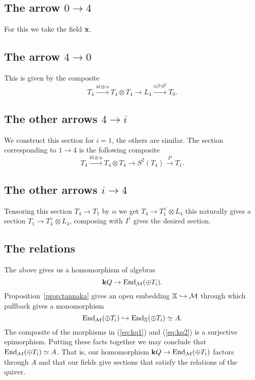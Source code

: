 \documentclass{amsart}
\theoremstyle{definition}
\begin{document}
\subsection{The arrow $0 \rightarrow 4$}

For this we take the field $\mathbf{x}$.

\subsection{The arrow $4 \rightarrow 0$}
This is given by the composite
$$T_4 \xrightarrow{\text{id}\otimes u} T_4 \otimes T_4 \rightarrow L_4 \xrightarrow{\alpha\beta\gamma\delta^2} T_0.$$

\subsection{The other arrows $4 \rightarrow i$}
We construct this section for $i=1$, the others are similar.
The section corresponding to $1 \rightarrow 4$ is the following composite $$T_4 \xrightarrow{\text{id}\otimes u} T_4 \otimes T_4 \rightarrow S^2(T_4) \xrightarrow{P} T_1.$$

\subsection{The other arrows $i \rightarrow 4$}
Tensoring this section $T_4 \rightarrow T_1$ by $\alpha$ we get $T_4 \rightarrow T_1^\vee \otimes L_4$ this naturally gives a section $T_1 \rightarrow T_4^\vee \otimes L_4$, composing with $I^\dagger$ gives the desired section.

\subsection{The relations}

The above gives us a homomorphism of algebras \begin{equation} \label{eq:kq1}
    \mathbf{k} Q \rightarrow \operatorname{End}_{\mathcal{M}}(\oplus T_i).
\end{equation}
Proposition~\ref{prop:tannaka} gives an open embedding $\mathbb{X} \hookrightarrow \mathcal{M}$ through which pullback gives a monomorphism \begin{equation}\label{eq:kq2}
    \operatorname{End}_{\mathcal{M}}(\oplus T_i) \hookrightarrow \operatorname{End}_{\mathbb{X}}(\oplus T_i) \simeq A.
\end{equation}
The composite of the morphisms in (\ref{eq:kq1}) and (\ref{eq:kq2}) is a surjective epimorphism.
Putting these facts together we may conclude that $\operatorname{End}_{\mathcal{M}}(\oplus T_i) \simeq A$.
That is, our homomorphism $\mathbf{k} Q \rightarrow \operatorname{End}_{\mathcal{M}}(\oplus T_i)$ factors through $A$ and that our fields give sections that satisfy the relations of the quiver.
\end{document}
